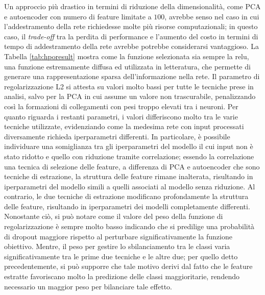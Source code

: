 Un approccio più drastico in termini di riduzione della dimensionalità, come PCA e autoencoder con numero di feature limitate a $100$, avrebbe senso nel caso in cui l'addestramento della rete richiedesse molte più risorse computazionali; in questo caso, il \textit{trade-off} tra la perdita di performance e l'aumento del costo in termini di tempo di addestramento della rete avrebbe potrebbe considerarsi vantaggioso.
La Tabella \ref{tab:hporesult} mostra come la funzione selezionata sia sempre la relu, una funzione estremamente diffusa ed utilizzata in letteratura, che permette di generare una rappresentazione sparsa dell'informazione nella rete. 
Il parametro di regolarizzazione L2 si attesta su valori molto bassi per tutte le tecniche prese in analisi, salvo per la PCA in cui assume un valore non trascurabile, penalizzando così la formazioni di collegamenti con pesi troppo elevati tra i neuroni. 
Per quanto riguarda i restanti parametri, i valori differiscono molto tra le varie tecniche utilizzate, evidenziando come la medesima rete con input processati diversamente richieda iperparametri differenti. 
In particolare, è possibile individuare una somiglianza tra gli iperparametri del modello il cui input non è stato ridotto e quello con riduzione tramite correlazione; essendo la correlazione una tecnica di selezione delle feature, a differenza di PCA e autoencoder che sono tecniche di estrazione, la struttura delle feature rimane inalterata, risultando in iperparametri del modello simili a quelli associati al modello senza riduzione. 
Al contrario, le due tecniche di estrazione modificano profondamente la struttura delle feature, risultando in iperparametri dei modelli completamente differenti.
Nonostante ciò, si può notare come il valore del peso della funzione di regolarizzazione è sempre molto basso indicando che si predilige una probabilità di dropout maggiore rispetto al perturbare significativamente la funzione obiettivo.
Mentre, il peso per gestire lo sbilanciamento tra le classi varia significativamente tra le prime due tecniche e le altre due; per quello detto precedentemente, si può supporre che tale motivo derivi dal fatto che le feature estratte favoriscano molto la predizione delle classi maggioritarie, rendendo necessario un maggior peso per bilanciare tale effetto.


